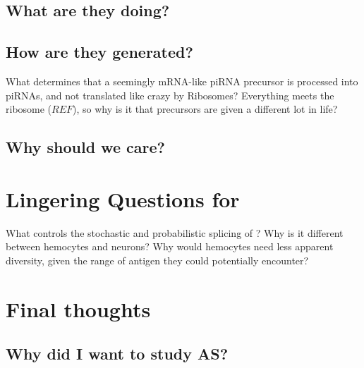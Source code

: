 
  \subsection{What are they doing?}


  \subsection{How are they generated?}


    What determines that a seemingly mRNA-like piRNA precursor is processed into piRNAs, and not translated like crazy by Ribosomes?  Everything meets the ribosome ($REF$), so why is it that precursors are given a different lot in life?

  \subsection{Why should we care?}

\section{Lingering Questions for \dscam{}}

  What controls the stochastic and probabilistic splicing of \dscam{}? Why is it different between hemocytes and neurons? Why would hemocytes need less apparent diversity, given the range of antigen they could potentially encounter?

\section{Final thoughts}

  \subsection{Why did I want to study AS?}

